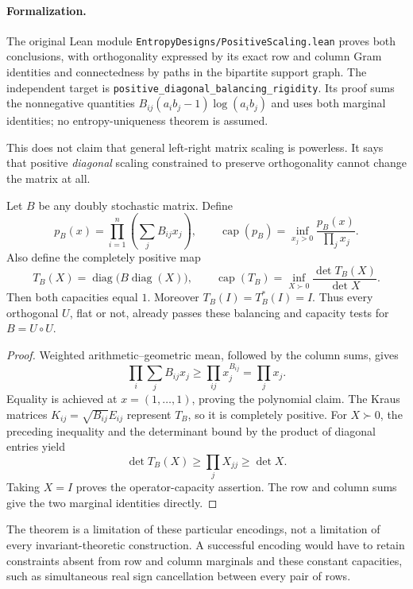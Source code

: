 \paragraph{Formalization.}
The original Lean module \texttt{EntropyDesigns/PositiveScaling.lean}
proves both conclusions, with orthogonality expressed by its exact
row and column Gram identities and connectedness by paths in the
bipartite support graph. The independent target is
\texttt{positive\_\allowbreak diagonal\_\allowbreak balancing\_\allowbreak rigidity}.
Its proof sums the nonnegative quantities
$B_{ij}(a_ib_j-1)\log(a_ib_j)$ and uses both marginal identities;
no entropy-uniqueness theorem is assumed.

This does not claim that general left-right matrix scaling is powerless.
It says that positive \emph{diagonal} scaling constrained to preserve
orthogonality cannot change the matrix at all.

\begin{proposition}
Let $B$ be any doubly stochastic matrix. Define
\[
 p_B(x)=\prod_{i=1}^n\left(\sum_j B_{ij}x_j\right),\qquad
 \operatorname{cap}(p_B)=\inf_{x_j>0}\frac{p_B(x)}{\prod_jx_j}.
\]
Also define the completely positive map
\[
 T_B(X)=\operatorname{diag}\bigl(B\operatorname{diag}(X)\bigr),
 \qquad
 \operatorname{cap}(T_B)=\inf_{X\succ0}
       \frac{\det T_B(X)}{\det X}.
\]
Then both capacities equal $1$. Moreover
$T_B(I)=T_B^*(I)=I$. Thus every orthogonal $U$, flat or not,
already passes these balancing and capacity tests for $B=U\circ U$.
\end{proposition}
\begin{proof}
Weighted arithmetic--geometric mean, followed by the column sums, gives
\[
 \prod_i\sum_jB_{ij}x_j
 \ge\prod_{ij}x_j^{B_{ij}}=\prod_jx_j.
\]
Equality is achieved at $x=(1,\ldots,1)$, proving the polynomial claim.
The Kraus matrices $K_{ij}=\sqrt{B_{ij}}E_{ij}$ represent $T_B$, so it
is completely positive. For $X\succ0$, the preceding inequality and
the determinant bound by the product of diagonal entries yield
\[
 \det T_B(X)\ge\prod_jX_{jj}\ge\det X.
\]
Taking $X=I$ proves the operator-capacity assertion. The row and column
sums give the two marginal identities directly.
\end{proof}

The theorem is a limitation of these particular encodings, not a
limitation of every invariant-theoretic construction. A successful
encoding would have to retain constraints absent from row and column
marginals and these constant capacities, such as simultaneous real
sign cancellation between every pair of rows.


